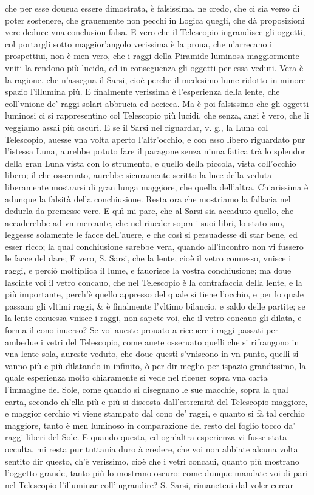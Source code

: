 \documentclass[11pt,twoside,openany]{book}
\begin{document}
che per esse doueua essere dimostrata, è falsissima, ne credo, che ci sia verso di poter sostenere, che grauemente non pecchi in Logica quegli, che dà proposizioni vere deduce vna conclusion falsa. E vero che il Telescopio ingrandisce gli oggetti, col portargli sotto maggior'angolo verissima è la proua, che n'arrecano i prospettiui, non è men vero, che i raggi della Piramide luminosa maggiormente vniti la rendono più lucida, ed in conseguenza gli oggetti per essa veduti. Vera è la ragione, che n'assegna il Sarsi, cioè perche il medesimo lume ridotto in minore spazio l'illumina più. E finalmente verissima è l'esperienza della lente, che coll'vnione de' raggi solari abbrucia ed accieca. Ma è poi falsissimo che gli oggetti luminosi ci si rappresentino col Telescopio più lucidi, che senza, anzi è vero, che li veggiamo assai più oscuri. E se il Sarsi nel riguardar, v. g., la Luna col Telescopio, auesse vna volta aperto l'altr'occhio, e con esso libero riguardato pur l'istessa Luna, aurebbe potuto fare il paragone senza niuna fatica trà lo splendor della gran Luna vista con lo strumento, e quello della piccola, vista coll'occhio libero; il che osseruato, aurebbe sicuramente scritto la luce della veduta liberamente mostrarsi di gran lunga maggiore, che quella dell'altra. Chiarissima è adunque la falsità della conchiusione. Resta ora che mostriamo la fallacia nel dedurla da premesse vere. E quì mi pare, che al Sarsi sia accaduto quello, che accaderebbe ad vn mercante, che nel riueder sopra i suoi libri, lo stato suo, leggesse solamente le facce dell'auere, e che così si persuadesse di star bene, ed esser ricco; la qual conchiusione sarebbe vera, quando all'incontro non vi fussero le facce del dare; E vero, S. Sarsi, che la lente, cioè il vetro conuesso, vnisce i raggi, e perciò moltiplica il lume, e fauorisce la vostra conchiusione; ma doue lasciate voi il vetro concauo, che nel Telescopio è la contrafaccia della lente, e la più importante, perch'è quello appresso del quale si tiene l'occhio, e per lo quale passano gli vltimi raggi, \& è finalmente l'vltimo bilancio, e saldo delle partite; se la lente conuessa vnisce i raggi, non sapete voi, che il vetro concauo gli dilata, e forma il cono inuerso? Se voi aueste prouato a riceuere i raggi passati per ambedue i vetri del Telescopio, come auete osseruato quelli che si rifrangono in vna lente sola, aureste veduto, che doue questi s'vniscono in vn punto, quelli si vanno più e più dilatando in infinito, ò per dir meglio per ispazio grandissimo, la quale esperienza molto chiaramente si vede nel riceuer sopra vna carta l'immagine del Sole, come quando si disegnano le sue macchie, sopra la qual carta, secondo ch'ella più e più si discosta dall'estremità del Telescopio maggiore, e maggior cerchio vi viene stampato dal cono de' raggi, e quanto si fà tal cerchio maggiore, tanto è men luminoso in comparazione del resto del foglio tocco da' raggi liberi del Sole. E quando questa, ed ogn'altra esperienza vi fusse stata occulta, mi resta pur tuttauia duro à credere, che voi non abbiate alcuna volta sentito dir questo, ch'è verissimo, cioè che i vetri concaui, quanto più mostrano l'oggetto grande, tanto più lo mostrano oscuro: come dunque mandate voi di pari nel Telescopio l'illuminar coll'ingrandire? S. Sarsi, rimaneteui dal voler cercar 
\end{document}

